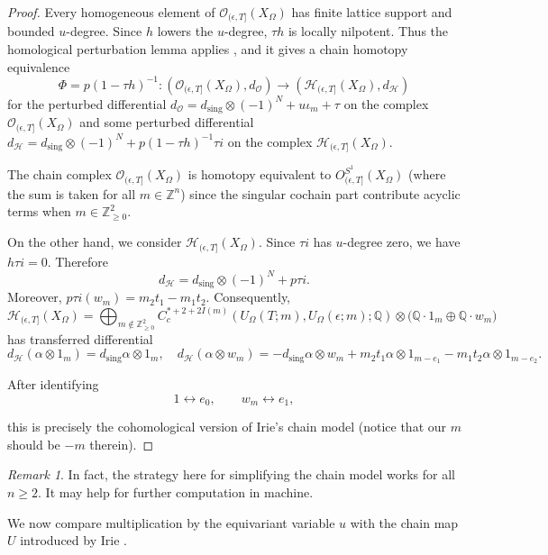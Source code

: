 \documentclass[11pt]{amsart}
\numberwithin{equation}{section}
\theoremstyle{plain}
\theoremstyle{definition}
\theoremstyle{remark}
\newtheorem{RMK}[rmk]{Remark}
\newcommand{\bQ} { {\mathbb{Q}}}
\newcommand{\bZ} { {\mathbb{Z}}}
\begin{document}
\begin{proof}
Every homogeneous element of $\mathcal O_{(\epsilon,T]}(X_\Omega)$
has finite lattice support and bounded $u$-degree. Since $h$ lowers the $u$-degree, $\tau h$ is locally nilpotent.
Thus the homological perturbation lemma applies \cite{Homological-perturbation}, and it 
gives a chain homotopy equivalence
\[
\Phi
=
p(1-\tau h)^{-1}
:
(\mathcal{O}_{(\epsilon,T]}(X_\Omega), d_{\mathcal{O}})
\longrightarrow
(\mathcal{H}_{(\epsilon,T]}(X_\Omega), d_{\mathcal{H}})
\]
for the perturbed differential $d_{\mathcal{O}} = d_{\mathrm{sing}}\otimes (-1)^N + u\iota_m + \tau$ on the complex $\mathcal{O}_{(\epsilon,T]}(X_\Omega)$ and some perturbed differential $d_{\mathcal{H}} = d_{\mathrm{sing}}\otimes (-1)^N + p(1-\tau h)^{-1}\tau i$ on the complex $\mathcal{H}_{(\epsilon,T]}(X_\Omega)$. 


The chain complex $\mathcal{O}_{(\epsilon,T]}(X_\Omega)$ is homotopy equivalent to $ {O}^{S^1}_{(\epsilon,T]}(X_\Omega)$ (where the sum is taken for all $m\in \bZ^n$) since the singular cochain part contribute acyclic terms when $m \in\bZ_{\geq0}^2$.

On the other hand, we consider $\mathcal{H}_{(\epsilon,T]}(X_\Omega)$. Since $\tau i$ has $u$-degree zero, we have $h\tau i=0$. Therefore
\[
d_{\mathcal{H}}
=
d_{\mathrm{sing}}\otimes (-1)^N+p\tau i.
\]
Moreover, $
p\tau i(w_m)
=
m_2t_1-m_1t_2
$. Consequently,
\[
\mathcal{H}_{(\epsilon,T]}(X_\Omega)
=
\bigoplus_{m\notin\bZ_{\geq0}^2}
C^{*+2+2I(m)}_c({U_\Omega(T;m)},U_\Omega(\epsilon;m) ;\bQ  )
\otimes
\bigl(
\bQ\cdot1_m\oplus\bQ\cdot w_m
\bigr)
\]
has transferred differential
\[
d_{\mathcal{H}}(\alpha\otimes1_m)
=
d_{\mathrm{sing}}\alpha\otimes1_m
,\quad 
d_{\mathcal{H}}(\alpha\otimes w_m)
=
-d_{\mathrm{sing}}\alpha\otimes w_m
+
m_2t_1\alpha \otimes 1_{m-e_1}-m_1 t_2 \alpha
\otimes 1_{m-e_2}.
\]

After identifying
\[
1\longleftrightarrow e_0,
\qquad
w_m\longleftrightarrow e_1,
\]

this is precisely the cohomological version of Irie's chain model
\cite{Irie_ChainModel} (notice that our $m$ should be $-m$ therein).
\end{proof}
\begin{RMK}In fact, the strategy here for simplifying the chain model works for all $n\geq 2$. It may help for further computation in machine.
\end{RMK}  


We now compare multiplication by the equivariant variable $u$ with the
chain map $U$ introduced by Irie \cite[Proposition 3.1]{Irie_ChainModel}.
\end{document}
